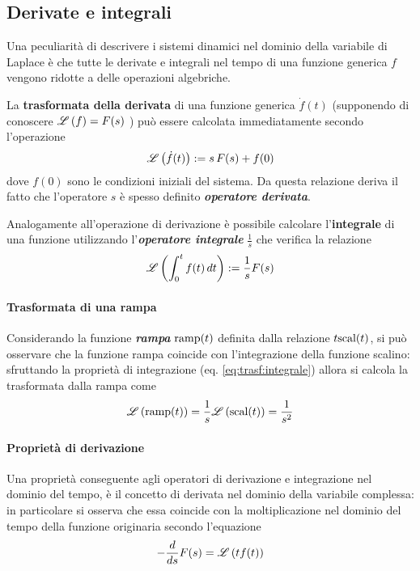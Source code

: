 	\subsection{Derivate e integrali}
		Una peculiarità di descrivere i sistemi dinamici nel dominio della variabile di Laplace è che tutte le derivate e integrali nel tempo di una funzione generica $f$ vengono ridotte a delle operazioni algebriche.
		\begin{concetto}
			La \textbf{trasformata della derivata} di una funzione generica $\dot f(t)$ (supponendo di conoscere $\mathscr L \left( f \right) = F(s)$ ) può essere calcolata immediatamente secondo l'operazione
			\begin{equation}
				\mathscr L \left( \dot f(t) \right) := s \, F(s) + f(0)
			\end{equation}
			dove $f(0)$ sono le condizioni iniziali del sistema. Da questa relazione deriva il fatto che l'operatore $s$ è spesso definito \textbf{\textit{operatore derivata}}.
			\vspace{2mm}
			
			Analogamente all'operazione di derivazione è possibile calcolare l'\textbf{integrale} di una funzione utilizzando l'\textbf{\textit{operatore integrale}} $\frac 1 s$ che verifica la relazione
			\begin{equation} \label{eq:trasf:integrale}
				\mathscr L \left( \int_0^t f(t)\, dt \right) : = \frac 1 s F(s)
			\end{equation}
		\end{concetto}
	
		\paragraph{Trasformata di una rampa} Considerando la funzione \textbf{\textit{rampa}} $\textrm{ramp}(t)$ definita dalla relazione $t \textrm{scal}(t)$, si può osservare che la funzione rampa coincide con l'integrazione della funzione scalino: sfruttando la proprietà di integrazione (eq. \ref{eq:trasf:integrale}) allora si calcola la trasformata dalla rampa come
		\begin{equation}
			\mathscr L \left( \textrm{ramp}(t) \right) = \frac 1 s \mathscr L \left( \textrm{scal}(t) \right) = \frac{1}{s^2}
		\end{equation}
		
		\paragraph{Proprietà di derivazione} Una proprietà conseguente agli operatori di derivazione e integrazione nel dominio del tempo, è il concetto di derivata nel dominio della variabile complessa: in particolare si osserva che essa coincide con la moltiplicazione nel dominio del tempo della funzione originaria secondo l'equazione
		\begin{equation} \label{eq:trasf:propderivazione}
			- \frac d {ds}F(s) = \mathscr L \left( t f(t) \right)
		\end{equation}
		
